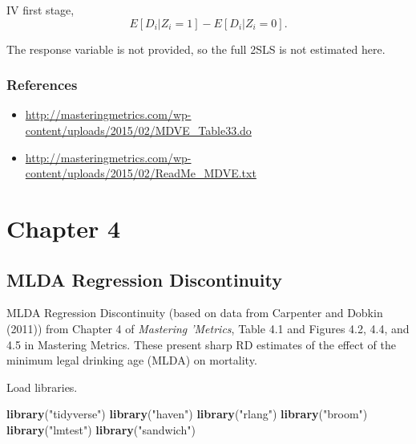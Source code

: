 \documentclass[]{book}
\newenvironment{Shaded}{\begin{snugshade}}{\end{snugshade}}
\newcommand{\CommentTok}[1]{\textcolor[rgb]{0.56,0.35,0.01}{\textit{#1}}}
\newcommand{\KeywordTok}[1]{\textcolor[rgb]{0.13,0.29,0.53}{\textbf{#1}}}
\newcommand{\NormalTok}[1]{#1}
\newcommand{\OperatorTok}[1]{\textcolor[rgb]{0.81,0.36,0.00}{\textbf{#1}}}
\newcommand{\StringTok}[1]{\textcolor[rgb]{0.31,0.60,0.02}{#1}}
\providecommand{\tightlist}{%
  \setlength{\itemsep}{0pt}\setlength{\parskip}{0pt}}
\theoremstyle{definition}
\theoremstyle{definition}
\theoremstyle{definition}
\theoremstyle{remark}
\begin{document}
IV first stage, \[
E[D_i | Z_i = 1] - E[D_i | Z_i = 0] .
\]

\begin{Shaded}
\end{Shaded}

The response variable is not provided, so the full 2SLS is not estimated
here.

\hypertarget{references-2}{%
\section{References}\label{references-2}}

\begin{itemize}
\tightlist
\item
  \url{http://masteringmetrics.com/wp-content/uploads/2015/02/MDVE_Table33.do}
\item
  \url{http://masteringmetrics.com/wp-content/uploads/2015/02/ReadMe_MDVE.txt}
\end{itemize}

\hypertarget{part-chapter-4}{%
\part{Chapter 4}\label{part-chapter-4}}

\hypertarget{mlda-regression-discontinuity}{%
\chapter{MLDA Regression
Discontinuity}\label{mlda-regression-discontinuity}}

MLDA Regression Discontinuity (based on data from Carpenter and Dobkin
(2011)) from Chapter 4 of \emph{Mastering 'Metrics}, Table 4.1 and
Figures 4.2, 4.4, and 4.5 in Mastering Metrics. These present sharp RD
estimates of the effect of the minimum legal drinking age (MLDA) on
mortality.

Load libraries.

\begin{Shaded}
\begin{Highlighting}[]
\KeywordTok{library}\NormalTok{(}\StringTok{"tidyverse"}\NormalTok{)}
\KeywordTok{library}\NormalTok{(}\StringTok{"haven"}\NormalTok{)}
\KeywordTok{library}\NormalTok{(}\StringTok{"rlang"}\NormalTok{)}
\KeywordTok{library}\NormalTok{(}\StringTok{"broom"}\NormalTok{)}
\KeywordTok{library}\NormalTok{(}\StringTok{"lmtest"}\NormalTok{)}
\KeywordTok{library}\NormalTok{(}\StringTok{"sandwich"}\NormalTok{)}
\end{Highlighting}
\end{Shaded}
\end{document}
